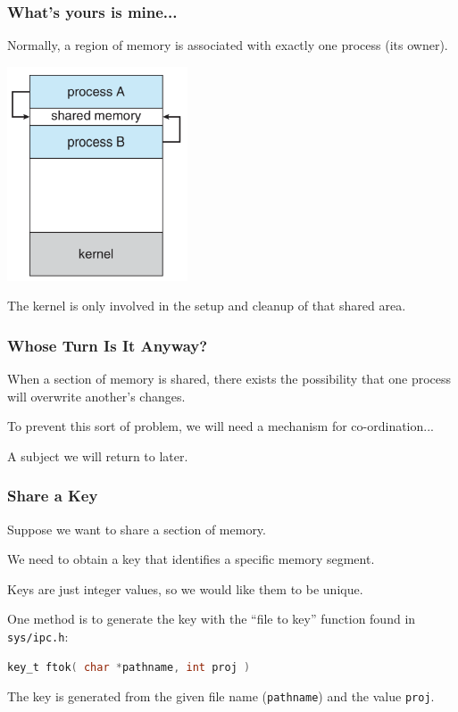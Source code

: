 \begin{frame}
	\frametitle{What's yours is mine...}

	Normally, a region of memory is associated with exactly one process (its owner).


	\begin{center}
		\includegraphics[width=0.4\textwidth]{images/shared-memory.png}
	\end{center}

	The kernel is only involved in the setup and cleanup of that shared area.

\end{frame}


\begin{frame}
	\frametitle{Whose Turn Is It Anyway?}

	When a section of memory is shared, there exists the possibility that one process will overwrite another's changes.

	To prevent this sort of problem, we will need a mechanism for co-ordination...

	A subject we will return to later.

\end{frame}


\begin{frame}[fragile]
	\frametitle{Share a Key}

	Suppose we want to share a section of memory.

	We need to obtain a \alert{key} that identifies a specific memory segment.

	Keys are just integer values, so we would like them to be unique.

	One method is to generate the key with the ``file to key'' function found in \texttt{sys/ipc.h}:
	\begin{lstlisting}[language=C]
key_t ftok( char *pathname, int proj )
\end{lstlisting}

	The key is generated from the given file name (\texttt{pathname}) and the value \texttt{proj}.

\end{frame}



